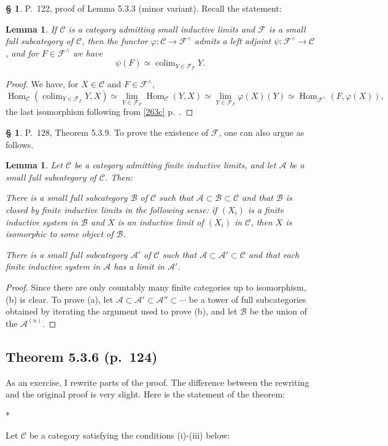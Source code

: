 \documentclass[12pt]{article}
\newtheorem{lem}[thm]{Lemma}
\theoremstyle{remark}
\theoremstyle{definition}
\newtheorem{s}[thm]{\S}
\newcommand{\A}{\mathcal A}
\newcommand{\B}{\mathcal B}
\newcommand{\C}{\mathcal C}
\newcommand{\F}{\mathcal F}
\newcommand{\mv}{ (minor variant)}
\DeclareMathOperator*{\co}{colim}
\DeclareMathOperator{\Hom}{Hom}%
\begin{document}
%
%
\begin{s} 
P.~122, proof of Lemma 5.3.3\mv. Recall the statement: 
%
\begin{lem}
If $\C$ is a category admitting small inductive limits and $\F$ is a small full subcategory of $\C$, then the functor $\varphi:\C\to\F^\wedge$ admits a left adjoint $\psi:\F^\wedge\to\C$, and for $F\in\F^\wedge$ we have 
$$
\psi(F)\simeq\co_{Y\in\F_F}Y. 
$$ 
\end{lem} 
%
\begin{proof}
We have, for $X\in\C$ and $F\in\F^\wedge$, 
$$
\Hom_\C\left(\co_{Y\in\F_F}Y,X\right)\simeq\lim_{Y\in\F_F}\Hom_\C(Y,X)
\simeq\lim_{Y\in\F_F}\varphi(X)(Y)\simeq\Hom_{\F^\wedge}(F,\varphi(X)),
$$  
the last isomorphism following from \eqref{263c} p.~\pageref{263c}.
\end{proof}
\end{s}
%
%
\begin{s} 
P.~128, Theorem 5.3.9. To prove the existence of $\F$, one can also argue as follows. 
%
\begin{lem} 
%
Let $\C$ be a category admitting finite inductive limits, and let $\A$ be a small full subcategory of $\C$. Then:

 There is a small full subcategory $\B$ of $\C$ such that $\A\subset\B\subset \C$ and that $\B$ is closed by finite inductive limits in the following sense: if $(X_i)$ is a finite inductive system in $\B$ and $X$ is an inductive limit of $(X_i)$ in $\C$, then $X$ is isomorphic to some object of $\B$.

 There is a small full subcategory $\A'$ of $\C$ such that $\A\subset\A'\subset \C$ and that each finite inductive system in $\A$ has a limit in $\A'$. 
%
\end{lem} 
%
\begin{proof}
Since there are only countably many finite categories up to isomorphism, (b) is clear. To prove (a), let $\A\subset\A'\subset\A''\subset\cdots$ be a tower of full subcategories obtained by iterating the argument used to prove (b), and let $\B$ be the union of the $\A^{(n)}$.
\end{proof}
\end{s}
%
%
\subsection{Theorem 5.3.6 (p.~124)}
%
As an exercise, I rewrite parts of the proof. The difference between the rewriting and the original proof is very slight. Here is the statement of the theorem:%
%
\begin{center}*\end{center}
%
Let $\C$ be a category satisfying the conditions (i)-(iii) below:
\end{document}
